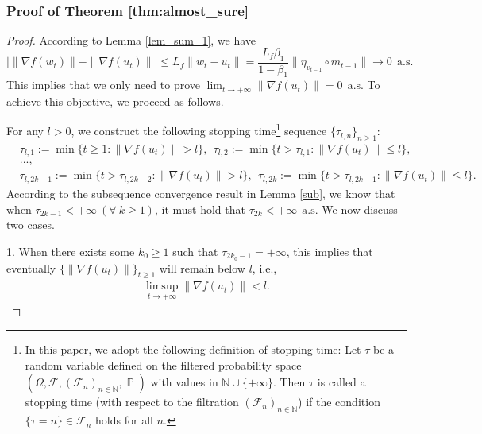 \documentclass{article} %
\DeclareMathOperator{\Pro}{\mathbb{P}}
\begin{document}
\subsubsection{Proof of Theorem \ref{thm:almost_sure}}
\begin{proof}
According to Lemma \ref{lem_sum_1}, we have
\[|\|\nabla f(w_{t})\| - \|\nabla f(u_{t})\| |\leq L_{f} \|w_{t} - u_{t}\| = \frac{L_{f} \beta_{1}}{1 - \beta_{1}} \|\eta_{v_{t-1}} \circ m_{t-1}\|\rightarrow 0\ \ \text{a.s.}\]
This implies that we only need to prove $\lim_{t \rightarrow +\infty} \|\nabla f(u_{t})\| = 0 \ \ \text{a.s.}$ To achieve this objective, we proceed as follows.

For any $l > 0$, we construct the following stopping time\footnote{In this paper, we adopt the following definition of stopping time: Let $\tau$ be a random variable defined on the filtered probability space $(\Omega, \mathscr{F}, (\mathscr{F}_n)_{n \in \mathbb{N}}, \Pro)$ with values in $\mathbb{N} \cup \{+\infty\}$. Then $\tau$ is called a {stopping time} (with respect to the filtration $ (\mathscr{F}_n)_{n \in \mathbb{N}}$) if the condition 
\(
\{\tau = n\} \in \mathscr{F}_n
\) holds for all $n$.} sequence $\{\tau_{l,n}\}_{n \geq 1}:$
\begin{align*}
&\tau_{l,1}:=\min\{t\ge 1:\|\nabla f(u_{t})\|>l\},\ \ \tau_{l,2}:=\min\{t>\tau_{l,1}:\|\nabla f(u_{t})\|\le l\},\\&...,\\&\tau_{l,2k-1}:=\min\{t>\tau_{l,2k-2}:\|\nabla f(u_{t})\|>l\},\ \ \tau_{l,2k}:=\min\{t>\tau_{l,2k-1}:\|\nabla f(u_{t})\|\le l\}.
\end{align*}
According to the subsequence convergence result in Lemma \ref{sub}, we know that when $\tau_{2k-1} < +\infty \ (\forall\ k \geq 1)$, it must hold that $\tau_{2k} < +\infty \ \ \text{a.s.}$ We now discuss two cases.

1. When there exists some $k_{0} \geq 1$ such that $\tau_{2k_{0}-1} = +\infty$, this implies that eventually $\{\|\nabla f(u_{t})\|\}_{t \geq 1}$ will remain below $l$, i.e.,
\begin{align}\label{sit_1}
\limsup_{t \rightarrow +\infty} \|\nabla f(u_{t})\| < l.
\end{align}


\end{proof}
\end{document}
